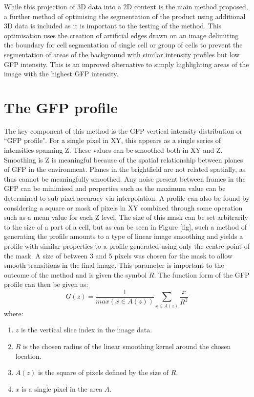While this projection of 3D data into a 2D context is the main method proposed, a further method of optimising the segmentation of the product using additional 3D data is included as it is important to the testing of the method. This optimisation uses the creation of artificial edges drawn on an image delimiting the boundary for cell segmentation of single cell or group of cells to prevent the segmentation of areas of the background with similar intensity profiles but low GFP intensity. This is an improved alternative to simply highlighting areas of the image with the highest GFP intensity.

\section{The GFP profile}

The key component of this method is the GFP vertical intensity distribution or ``GFP profile". For a single pixel in XY, this appears as a single series of intensities spanning Z. These values can be smoothed both in XY and Z. Smoothing is Z is meaningful because of the spatial relationship between planes of GFP in the environment. Planes in the brightfield are not related spatially, as thus cannot be meaningfully smoothed. Any noise present between frames in the GFP can be minimised and properties such as the maximum value can be determined to sub-pixel accuracy via interpolation. A profile can also be found by considering a square or mask of pixels in XY combined through some operation such as a mean value for each Z level. The size of this mask can be set arbitrarily to the size of a part of a cell, but as can be seen in Figure [fig], such a method of generating the profile amounts to a type of linear image smoothing and yields a profile with similar properties to a profile generated using only the centre point of the mask. A size of between 3 and 5 pixels was chosen for the mask to allow smooth transitions in the final image. This parameter is important to the outcome of the method and is given the symbol $R$. The function form of the GFP profile can then be given as:
$$ G(z) = \frac{1}{max(x \in A(z))}\sum_{x \in A(z)} \frac{x}{R^2} $$
where:
\begin{enumerate}
	\item $z$ is the vertical slice index in the image data.
	\item $R$ is the chosen radius of the linear smoothing kernel around the chosen location.
	\item $A(z)$ is the square of pixels defined by the size of $R$.
	\item $x$ is a single pixel in the area $A$.
\end{enumerate}

